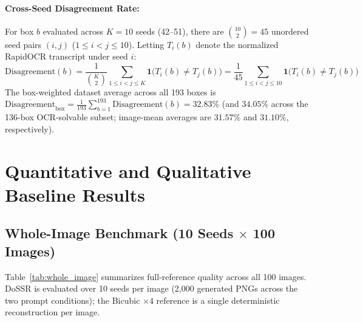 \documentclass[11pt]{article}
\begin{document}
\paragraph{Cross-Seed Disagreement Rate:} For box $b$ evaluated across $K = 10$ seeds (42--51), there are $\binom{10}{2} = 45$ unordered seed pairs $(i, j)$ ($1 \le i < j \le 10$). Letting $T_i(b)$ denote the normalized RapidOCR transcript under seed $i$:
\begin{equation}
\text{Disagreement}(b) = \frac{1}{\binom{K}{2}} \sum_{1 \le i < j \le K} \mathbf{1}\bigl(T_i(b) \ne T_j(b)\bigr) = \frac{1}{45} \sum_{1 \le i < j \le 10} \mathbf{1}\bigl(T_i(b) \ne T_j(b)\bigr)
\end{equation}
The box-weighted dataset average across all 193 boxes is $\overline{\text{Disagreement}}_{\text{box}} = \frac{1}{193} \sum_{b=1}^{193} \text{Disagreement}(b) = 32.83\%$ (and $34.05\%$ across the 136-box OCR-solvable subset; image-mean averages are $31.57\%$ and $31.10\%$, respectively).

\section{Quantitative and Qualitative Baseline Results}
\subsection{Whole-Image Benchmark (10 Seeds \texorpdfstring{$\times$}{x} 100 Images)}
Table~\ref{tab:whole_image} summarizes full-reference quality across all 100 images. DoSSR is evaluated over 10 seeds per image (2,000 generated PNGs across the two prompt conditions); the Bicubic $\times 4$ reference is a single deterministic reconstruction per image.
\end{document}

